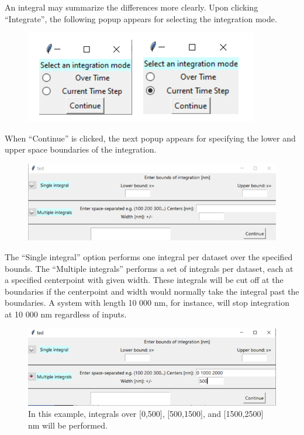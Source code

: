 \documentclass[11pt,letterpaper,titlepage]{article}
\begin{document}
		\par An integral may summarize the differences more clearly. Upon clicking “Integrate”, the following popup appears for selecting the integration mode.
		
		\begin{figure}[H]
			\label{fig:integration_mode_example}
			\centering
			\includegraphics{"integration_mode_example"}
		\end{figure}
		
		\par When “Continue” is clicked, the next popup appears for specifying the lower and upper space boundaries of the integration.
		
		\begin{figure}[H]
			\label{fig:integration_getbounds_blank}
			\centering
			\includegraphics{"integration_getbounds_blank"}
		\end{figure}
	
		\par The “Single integral” option performs one integral per dataset over the specified bounds. The “Multiple integrals” performs a set of integrals per dataset, each at a specified centerpoint with given width. These integrals will be cut off at the boundaries if the centerpoint and width would normally take the integral past the boundaries. A system with length 10 000 nm, for instance, will stop integration at 10 000 nm regardless of inputs.
		
		\begin{figure}[H]
			\label{fig:integration_getbounds_example}
			\centering
			\includegraphics{"integration_getbounds_example"}
			\caption{In this example, integrals over [0,500], [500,1500], and [1500,2500] nm will be performed.}
			
		\end{figure}
		
\end{document}
